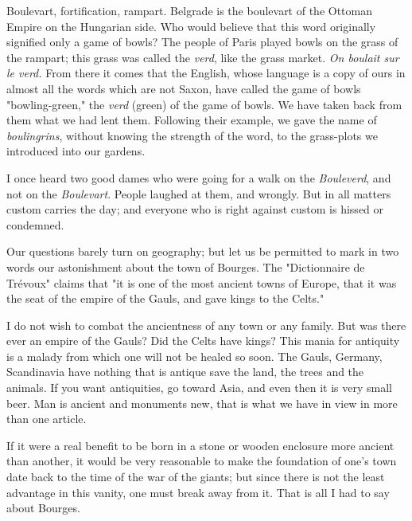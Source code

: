 

Boulevart, fortification, rampart. Belgrade is the boulevart of the
Ottoman Empire on the Hungarian side. Who would believe that this word
originally signified only a game of bowls? The people of Paris played
bowls on the grass of the rampart; this grass was called the \textit{verd},
like the grass market. \textit{On boulait sur le verd.} From there it comes
that the English, whose language is a copy of ours in almost all the
words which are not Saxon, have called the game of bowls
"bowling-green," the \textit{verd} (green) of the game of bowls. We have taken
back from them what we had lent them. Following their example, we gave
the name of \textit{boulingrins}, without knowing the strength of the word, to
the grass-plots we introduced into our gardens.

I once heard two good dames who were going for a walk on the
\textit{Bouleverd}, and not on the \textit{Boulevart}. People laughed at them, and
wrongly. But in all matters custom carries the day; and everyone who is
right against custom is hissed or condemned.






Our questions barely turn on geography; but let us be permitted to mark
in two words our astonishment about the town of Bourges. The
"Dictionnaire de Trévoux" claims that "it is one of the most ancient
towns of Europe, that it was the seat of the empire of the Gauls, and
gave kings to the Celts."

I do not wish to combat the ancientness of any town or any family. But
was there ever an empire of the Gauls? Did the Celts have kings? This
mania for antiquity is a malady from which one will not be healed so
soon. The Gauls, Germany, Scandinavia have nothing that is antique save
the land, the trees and the animals. If you want antiquities, go toward
Asia, and even then it is very small beer. Man is ancient and monuments
new, that is what we have in view in more than one article.

If it were a real benefit to be born in a stone or wooden enclosure more
ancient than another, it would be very reasonable to make the foundation
of one's town date back to the time of the war of the giants; but since
there is not the least advantage in this vanity, one must break away
from it. That is all I had to say about Bourges.






